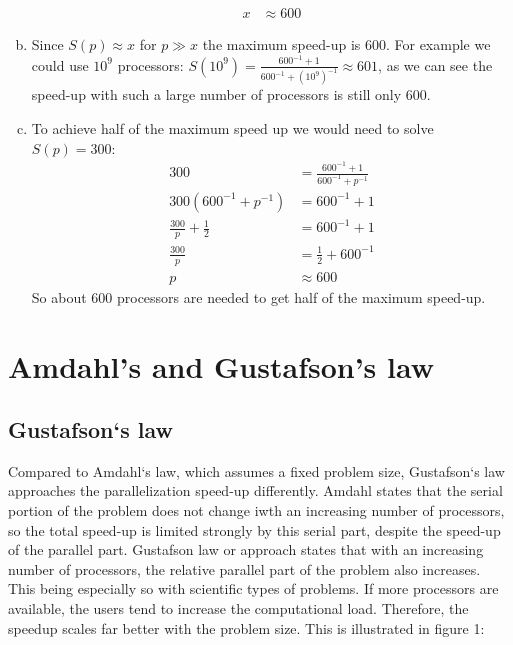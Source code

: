 \documentclass[a4paper]{article}
\begin{document}
\begin{enumerate}[(a)]
\begin{align*}
			x &\approx 600
		\end{align*}
	\item Since $S(p) \approx x$ for $p \gg x$ the maximum speed-up is 600. For example we could use $10^9$ processors: $\displaystyle S(10^9) = \frac{600^{-1} + 1}{600^{-1} + (10^9)^{-1}} \approx 601$, as we can see the speed-up with such a large number of processors is still only 600.
	\item To achieve half of the maximum speed up we would need to solve $S(p) = 300$:
		\begin{align*}
			300 &= \frac{600^{-1} + 1}{600^{-1} + p^{-1}} \\
			300 (600^{-1} + p^{-1}) &= 600^{-1} + 1 \\
			\frac{300}{p} + \frac{1}{2} &= 600^{-1} + 1 \\
			\frac{300}{p} &= \frac{1}{2} + 600^{-1} \\
			p &\approx 600
		\end{align*}
		So about 600 processors are needed to get half of the maximum speed-up.
\end{enumerate}

\section{Amdahl's and Gustafson's law}
\subsection{Gustafson`s law}
Compared to Amdahl`s law, which assumes a fixed problem size, Gustafson`s law approaches the parallelization speed-up differently. Amdahl states that the serial portion of the problem does not change iwth an increasing number of processors, so the total speed-up is limited strongly by this serial part, despite the speed-up of the parallel part.
Gustafson law or approach states that with an increasing number of processors, the relative parallel part of the problem also increases. This being especially so with scientific types of problems. If more processors are available, the users tend to increase the computational load. Therefore, the speedup scales far better with the problem size. This is illustrated in figure 1:
\end{document}
